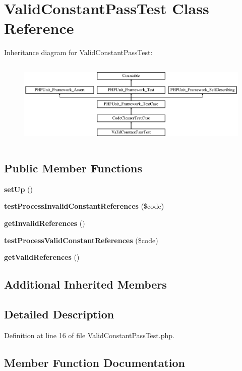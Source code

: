 \section{Valid\+Constant\+Pass\+Test Class Reference}
\label{class_psy_1_1_test_1_1_code_cleaner_1_1_valid_constant_pass_test}
Inheritance diagram for Valid\+Constant\+Pass\+Test\+:\begin{figure}[H]
\begin{center}
\leavevmode
\includegraphics[height=4.129793cm]{class_psy_1_1_test_1_1_code_cleaner_1_1_valid_constant_pass_test}
\end{center}
\end{figure}
\subsection*{Public Member Functions}
\begin{DoxyCompactItemize}
\item 
{\bf set\+Up} ()
\item 
{\bf test\+Process\+Invalid\+Constant\+References} (\$code)
\item 
{\bf get\+Invalid\+References} ()
\item 
{\bf test\+Process\+Valid\+Constant\+References} (\$code)
\item 
{\bf get\+Valid\+References} ()
\end{DoxyCompactItemize}
\subsection*{Additional Inherited Members}


\subsection{Detailed Description}


Definition at line 16 of file Valid\+Constant\+Pass\+Test.\+php.



\subsection{Member Function Documentation}
